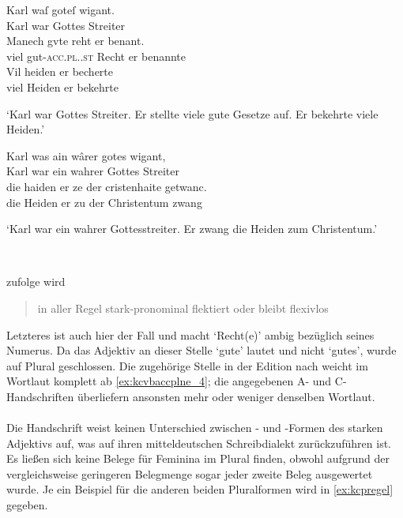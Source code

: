\begin{exe}
\ex \label{ex:kcvbaccplne}
	\begin{xlist}
	\ex \gll Karl waſ goteſ wigant. \\
			Karl war Gottes Streiter \\
	\sn \gll Manech gvte reht er benant. \\
			viel gut-\textsc{acc.pl.\NeutI.st} Recht er benannte \\
	\sn \gll Vil heiden er becherte \\
			viel Heiden er bekehrte \\
		\begin{taggedline}{\parencites[\pno~100\vb, 13--15]{kc:VB}[vgl.][40\va,
		10--12]{kc:B1}}
		\trans `Karl war Gottes Streiter. Er stellte viele gute
			Gesetze auf. Er bekehrte viele Heiden.'
		\end{taggedline}
		\label{ex:kcvbaccplne_2}

	\ex \gll Karl was ain wârer gotes wigant, \\
			Karl war ein wahrer Gottes Streiter \\
	\sn \gll die haiden er ze der cristenhaite getwanc. \\
			die Heiden er zu der Christentum zwang \\
		\begin{taggedline}{%
			\parencites[15073--15074]{schroeder1895}[vgl.]%
			[\pno~64\va, 37--38]{kc:A1}%
			[\pno~115\va, 13--14]{kc:M}%
			[\pno~92\ra, 1--2]{kc:H}%
			[\pno~78\rb, 34]{kc:C1}%
			[\pno~89\rb, 26--27]{kc:K}%
			[\pno~304\va, 4--5]{kc:Z}%
		}
		\trans `Karl war ein wahrer Gottesstreiter. Er zwang die Heiden
			zum Christentum.'
		\end{taggedline}
		\label{ex:kcvbaccplne_4}
		\\
	\end{xlist}
\end{exe}

\citeauthor{ksw2} zufolge wird  \blockcquote[585]{ksw2}{in
aller Regel stark-pronominal flektiert oder bleibt flexivlos}. Letzteres ist
auch hier der Fall und macht  `Recht(e)' ambig bezüglich seines
Numerus. Da das Adjektiv an dieser Stelle  `gute' lautet und
nicht  `gutes', wurde auf Plural geschlossen. Die zugehörige
Stelle in der Edition nach \citet{kc:A1} weicht im Wortlaut komplett ab
\cref{ex:kcvbaccplne_4}; die angegebenen A- und C-Handschriften überliefern
ansonsten mehr oder weniger denselben Wortlaut.

\paragraph{\citet{kc:P}}
Die Handschrift \citet{kc:P} weist keinen Unterschied zwischen - und
-Formen des starken Adjektivs auf, was auf ihren mitteldeutschen
Schreibdialekt zurückzuführen ist. Es ließen sich keine Belege für Feminina im
Plural finden, obwohl aufgrund der vergleichsweise geringeren Belegmenge sogar
jeder zweite Beleg ausgewertet wurde. Je ein Beispiel für die anderen beiden
Pluralformen wird in \cref{ex:kcpregel} gegeben.


